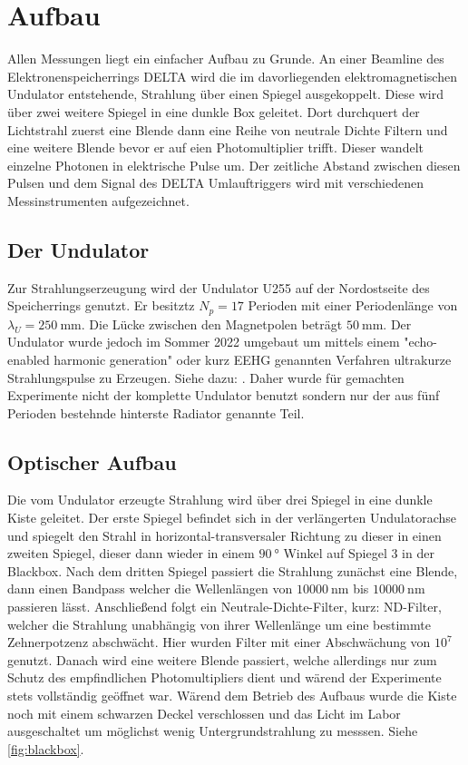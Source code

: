 \section{Aufbau}
\label{sec:Aufbau}
Allen Messungen liegt ein einfacher Aufbau zu Grunde. An einer Beamline des Elektronenspeicherrings DELTA
wird die im davorliegenden elektromagnetischen Undulator entstehende, Strahlung über einen Spiegel 
ausgekoppelt. Diese wird über zwei weitere Spiegel in eine dunkle Box geleitet. Dort durchquert der 
Lichtstrahl zuerst eine Blende dann eine Reihe von neutrale Dichte Filtern und eine weitere Blende bevor 
er auf eien Photomultiplier trifft. Dieser wandelt einzelne Photonen in elektrische Pulse um. Der 
zeitliche Abstand zwischen diesen Pulsen und dem Signal des DELTA Umlauftriggers wird mit verschiedenen 
Messinstrumenten aufgezeichnet. 

\subsection{Der Undulator}
\label{sec:Undulator}
Zur Strahlungserzeugung wird der Undulator U255 auf der Nordostseite des Speicherrings genutzt.
Er besitztz $N_p= 17$ Perioden mit einer Periodenlänge von $\lambda_U=\SI{250}{\milli\meter}$.
Die Lücke zwischen den Magnetpolen beträgt $\SI{50}{\milli\meter}$. Der Undulator wurde jedoch
im Sommer 2022 umgebaut um mittels einem "echo-enabled harmonic generation" oder kurz EEHG 
genannten Verfahren ultrakurze Strahlungspulse zu Erzeugen. Siehe dazu: . Daher wurde für gemachten 
Experimente nicht der komplette Undulator benutzt sondern nur der aus fünf Perioden bestehnde hinterste
Radiator genannte Teil.

\subsection{Optischer Aufbau}
\label{sec:Optik}
Die vom Undulator erzeugte Strahlung wird über drei Spiegel in eine dunkle Kiste geleitet. Der erste Spiegel
befindet sich in der verlängerten Undulatorachse und spiegelt den Strahl in horizontal-transversaler Richtung 
zu dieser in einen zweiten Spiegel, dieser dann wieder in einem $\SI{90}{\degree}$ Winkel auf Spiegel 3 in der
Blackbox. Nach dem dritten Spiegel passiert die Strahlung zunächst eine Blende, dann einen Bandpass welcher die 
Wellenlängen von $\SI{10000}{\nano\meter}$ bis $\SI{10000}{\nano\meter}$ passieren lässt. Anschließend folgt
ein Neutrale-Dichte-Filter, kurz: ND-Filter, welcher die Strahlung unabhängig von ihrer Wellenlänge um eine
bestimmte Zehnerpotzenz abschwächt. Hier wurden Filter mit einer Abschwächung von $10^7$ genutzt. Danach 
wird eine weitere Blende passiert, welche allerdings nur zum Schutz des empfindlichen Photomultipliers dient 
und wärend der Experimente stets vollständig geöffnet war. Wärend dem Betrieb des Aufbaus wurde die Kiste noch 
mit einem schwarzen Deckel verschlossen und das Licht im Labor ausgeschaltet um möglichst wenig Untergrundstrahlung
zu messsen. Siehe \autoref{fig:blackbox}.

